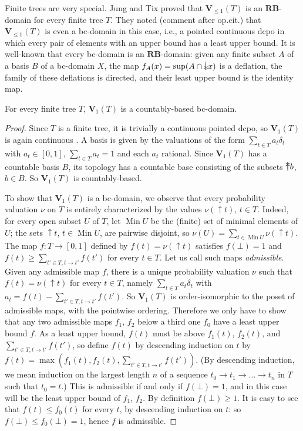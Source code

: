 \documentclass{LMCS}
\newcommand\Min{\mathop{\text{Min}}}
\newcommand\upc{\mathop{\uparrow}\nolimits}
\newcommand\uuarrow{\rlap{$\uparrow$}\raise.5ex\hbox{$\uparrow$}}\newcommand\ddarrow{\rlap{$\downarrow$}\raise.5ex\hbox{$\downarrow$}}\newcommand\Fin{\mathop{\text{Fin}}}
\newcommand\RB{\mathbf{RB}}
\newcommand\Val{\mathbf V}
\begin{document}
Finite trees are very special.  Jung and Tix proved that $\Val_{\leq
  1} (T)$ is an $\RB$-domain \cite[Theorem~13]{JT:troublesome} for
every finite tree $T$.  They noted (comment after op.cit.) that
$\Val_{\leq 1} (T)$ is even a bc-domain in this case, i.e., a pointed
continuous dcpo in which every pair of elements with an upper bound
has a least upper bound.  It is well-known that every bc-domain is an
$\RB$-domain: given any finite subset $A$ of a basis $B$ of a
bc-domain $X$, the map $f_A (x) = \sup (A \cap \ddarrow x)$ is a
deflation, the family of these deflations is directed, and their least
upper bound is the identity map.
\begin{lem}
  \label{lemma:V1:bc}
  For every finite tree $T$, $\Val_1 (T)$ is a countably-based
  bc-domain.
\end{lem}
\begin{proof}
  Since $T$ is a finite tree, it is trivially a continuous pointed
  dcpo, so $\Val_1 (T)$ is again continuous
  \cite[Section~3]{Edalat:int}.  A basis is given by the valuations of
  the form $\sum_{t \in T} a_t \delta_t$ with $a_t \in [0, 1]$,
  $\sum_{t \in T} a_t=1$ and each $a_t$ rational.  Since $\Val_1 (T)$
  has a countable basis $B$, its topology has a countable base
  consisting of the subsets $\uuarrow b$, $b \in B$.  So $\Val_1 (T)$
  is countably-based.

  To show that $\Val_1 (T)$ is a bc-domain, we observe that every
  probability valuation $\nu$ on $T$ is entirely characterized by the
  values $\nu (\upc t)$, $t \in T$.  Indeed, for every open subset $U$
  of $T$, let $\Min U$ be the (finite) set of minimal elements of $U$;
  the sets $\upc t$, $t \in \Min U$, are pairwise disjoint, so $\nu
  (U) = \sum_{t \in \Min U} \nu (\upc t)$.  The map $f : T \to [0, 1]$
  defined by $f (t) = \nu (\upc t)$ satisfies $f (\bot)=1$ and $f (t)
  \geq \sum_{t' \in T, t \to t'} f (t')$ for every $t \in T$.  Let us
  call such maps {\em admissible\/}.  Given any admissible map $f$,
  there is a unique probability valuation $\nu$ such that $f (t) = \nu
  (\upc t)$ for every $t \in T$, namely $\sum_{t \in T} a_t \delta_t$
  with $a_t = f (t) - \sum_{t' \in T, t \to t'} f (t')$.  So $\Val_1
  (T)$ is order-isomorphic to the poset of admissible maps, with the
  pointwise ordering.  Therefore we only have to show that any two
  admissible maps $f_1$, $f_2$ below a third one $f_0$ have a least
  upper bound $f$.  As a least upper bound, $f (t)$ must be above $f_1
  (t)$, $f_2 (t)$, and $\sum_{t' \in T, t \to t'} f (t')$, so define
  $f (t)$ by descending induction on $t$ by $f (t) = \max (f_1 (t),
  f_2 (t), \sum_{t' \in T, t \to t'} f (t'))$.  (By descending
  induction, we mean induction on the largest length $n$ of a sequence
  $t_0 \to t_1 \to \ldots \to t_n$ in $T$ such that $t_0=t$.)  This is
  admissible if and only if $f (\bot)=1$, and in this case will be the
  least upper bound of $f_1$, $f_2$.  By definition $f (\bot) \geq 1$.
  It is easy to see that $f (t) \leq f_0 (t)$ for every $t$, by
  descending induction on $t$: so $f (\bot) \leq f_0 (\bot)=1$, hence
  $f$ is admissible.
\end{proof}
\end{document}
